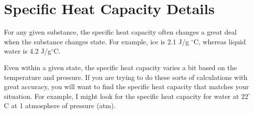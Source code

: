 \section{Specific Heat Capacity Details}

For any given substance, the specific heat capacity often changes a
great deal when the substance changes state. For example, ice is 2.1 J/g
$^\circ$C, whereas liquid water is 4.2 J/g$^\circ$C.

Even within a given state, the specific heat capacity varies a bit
based on the temperature and pressure. If you are trying to do these
sorts of calculations with great accuracy, you will want to find the
specific heat capacity that matches your situation. For example, I
might look for the specific heat capacity for water at $22^\circ$C at
1 atmosphere of pressure (atm).
